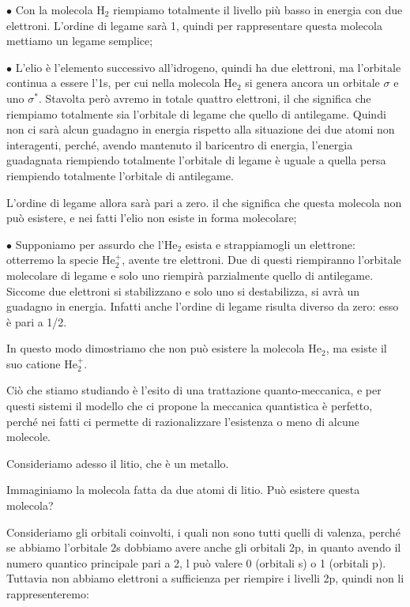 \vspace{0.2cm}$\bullet$ Con la molecola H$_2$ riempiamo totalmente il livello più basso in energia con due elettroni. L'ordine di legame sarà 1, quindi per rappresentare questa molecola mettiamo un legame semplice;

\vspace{0.2cm}$\bullet$ L'elio è l'elemento successivo all'idrogeno, quindi ha due elettroni, ma l'orbitale continua a essere l'1s, per cui nella molecola He$_2$ si genera ancora un orbitale $\sigma$ e uno $\sigma^*$. Stavolta però avremo in totale quattro elettroni, il che significa che riempiamo totalmente sia l'orbitale di legame che quello di antilegame. Quindi non ci sarà alcun guadagno in energia rispetto alla situazione dei due atomi non interagenti, perché, avendo mantenuto il baricentro di energia, l'energia guadagnata riempiendo totalmente l'orbitale di legame è uguale a quella persa riempiendo totalmente l'orbitale di antilegame.

L'ordine di legame allora sarà pari a zero. il che significa che questa molecola non può esistere, e nei fatti l'elio non esiste in forma molecolare;

\vspace{0.2cm}$\bullet$ Supponiamo per assurdo che l'He$_2$ esista e strappiamogli un elettrone: otterremo la specie He$_2^+$, avente tre elettroni. Due di questi riempiranno l'orbitale molecolare di legame e solo uno riempirà parzialmente quello di antilegame. Siccome due elettroni si stabilizzano e solo uno si destabilizza, si avrà un guadagno in energia. Infatti anche l'ordine di legame risulta diverso da zero: esso è pari a 1/2.

In questo modo dimostriamo che non può esistere la molecola He$_2$, ma esiste il suo catione He$_2^+$.

\vspace{0.2cm} Ciò che stiamo studiando è l'esito di una trattazione quanto-meccanica, e per questi sistemi il modello che ci propone la meccanica quantistica è perfetto, perché nei fatti ci permette di razionalizzare l'esistenza o meno di alcune molecole.

\vspace{0.2cm}Consideriamo adesso il litio, che è un metallo.

Immaginiamo la molecola fatta da due atomi di litio. Può esistere questa molecola?

Consideriamo gli orbitali coinvolti, i quali non sono tutti quelli di valenza, perché se abbiamo l'orbitale 2s dobbiamo avere anche gli orbitali 2p, in quanto avendo il numero quantico principale pari a 2, l può valere 0 (orbitali s) o 1 (orbitali p). Tuttavia non abbiamo elettroni a sufficienza per riempire i livelli 2p, quindi non li rappresenteremo:

